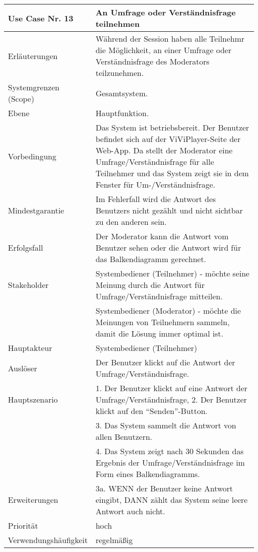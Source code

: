 \begin{tabularx}{\linewidth}{|l|X|}
	\hline
	Use Case Nr. 13			& \textbf{An Umfrage oder Verständnisfrage teilnehmen} \\ \hline
	Erläuterungen			& Während der Session haben alle Teilnehmr die Möglichkeit, an einer 
							  Umfrage oder Verständnisfrage des Moderators teilzunehmen. \\ \hline
	Systemgrenzen (Scope)	& Gesamtsystem. \\ \hline
	Ebene					& Hauptfunktion. \\ \hline
	Vorbedingung			& Das System ist betriebsbereit. Der Benutzer befindet sich auf der 
							  ViViPlayer-Seite der Web-App. Da stellt der Moderator eine Umfrage/Verständnisfrage für alle Teilnehmer und das System zeigt sie in dem Fenster für Um-/Verständnisfrage. \\ \hline
	Mindestgarantie			& Im Fehlerfall wird die Antwort des Benutzers nicht gezählt und 
							  nicht sichtbar zu den anderen sein. \\ \hline
	Erfolgsfall				& Der Moderator kann die Antwort vom Benutzer sehen oder die Antwort 
							  wird für das Balkendiagramm gerechnet. \\ \hline
	Stakeholder				& Systembediener (Teilnehmer) - möchte seine Meinung durch die 
							  Antwort für Umfrage/Verständnisfrage mitteilen. \\
							& Systembediener (Moderator) - möchte die Meinungen von Teilnehmern
							  sammeln, damit die Lösung immer optimal ist. \\ \hline
	Hauptakteur				& Systembediener (Teilnehmer) \\ \hline
	Auslöser				& Der Benutzer klickt auf die Antwort der Umfrage/Verständnisfrage. \\
							  \hline	
	Hauptszenario			& 1. Der Benutzer klickt auf eine Antwort der Umfrage/Verständnisfrage,
	                          2. Der Benutzer klickt auf den ``Senden''-Button. \\
							& 3. Das System sammelt die Antwort von allen Benutzern. \\
							& 4. Das System zeigt nach 30 Sekunden das Ergebnis der
							  Umfrage/Verständnisfrage im Form eines Balkendiagramms. \\ \hline
	Erweiterungen			& 3a. WENN der Benutzer keine Antwort eingibt, DANN zählt das System 
							  seine leere Antwort auch nicht. \\ \hline
	Priorität				& hoch \\ \hline
	Verwendungshäufigkeit	& regelmäßig \\ \hline
\end{tabularx}

